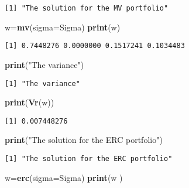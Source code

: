 \documentclass[]{article}
\newenvironment{Shaded}{\begin{snugshade}}{\end{snugshade}}
\newcommand{\KeywordTok}[1]{\textcolor[rgb]{0.13,0.29,0.53}{\textbf{{#1}}}}
\newcommand{\DataTypeTok}[1]{\textcolor[rgb]{0.13,0.29,0.53}{{#1}}}
\newcommand{\StringTok}[1]{\textcolor[rgb]{0.31,0.60,0.02}{{#1}}}
\newcommand{\NormalTok}[1]{{#1}}
\begin{document}
\begin{verbatim}
[1] "The solution for the MV portfolio"
\end{verbatim}

\begin{Shaded}
\begin{Highlighting}[]
\NormalTok{w=}\KeywordTok{mv}\NormalTok{(}\DataTypeTok{sigma=}\NormalTok{Sigma)}
\KeywordTok{print}\NormalTok{(w)}
\end{Highlighting}
\end{Shaded}

\begin{verbatim}
[1] 0.7448276 0.0000000 0.1517241 0.1034483
\end{verbatim}

\begin{Shaded}
\begin{Highlighting}[]
\KeywordTok{print}\NormalTok{(}\StringTok{"The variance"}\NormalTok{)}
\end{Highlighting}
\end{Shaded}

\begin{verbatim}
[1] "The variance"
\end{verbatim}

\begin{Shaded}
\begin{Highlighting}[]
\KeywordTok{print}\NormalTok{(}\KeywordTok{Vr}\NormalTok{(w))}
\end{Highlighting}
\end{Shaded}

\begin{verbatim}
[1] 0.007448276
\end{verbatim}

\begin{Shaded}
\begin{Highlighting}[]
\KeywordTok{print}\NormalTok{(}\StringTok{"The solution for the ERC portfolio"}\NormalTok{)}
\end{Highlighting}
\end{Shaded}

\begin{verbatim}
[1] "The solution for the ERC portfolio"
\end{verbatim}

\begin{Shaded}
\begin{Highlighting}[]
\NormalTok{w=}\KeywordTok{erc}\NormalTok{(}\DataTypeTok{sigma=}\NormalTok{Sigma)}
\KeywordTok{print}\NormalTok{(w )}
\end{Highlighting}
\end{Shaded}
\end{document}
